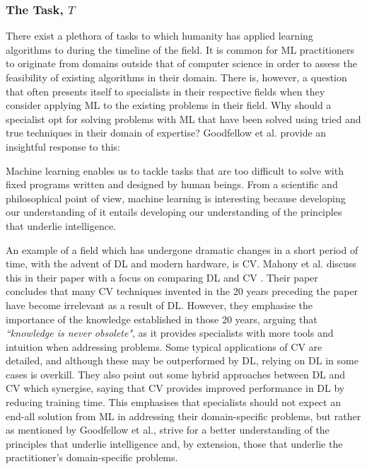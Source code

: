 \subsubsection{The Task, $T$}
There exist a plethora of tasks to which humanity has applied learning algorithms to during the timeline of the field. It is common for \gls{ML} practitioners to originate from domains outside that of computer science in order to assess the feasibility of existing algorithms in their domain. There is, however, a question that often presents itself to specialists in their respective fields when they consider applying \gls{ML} to the existing problems in their field. Why should a specialist opt for solving problems with \gls{ML} that have been solved using tried and true techniques in their domain of expertise? Goodfellow et al. \cite{Goodfellow-et-al-2016} provide an insightful response to this:

\begin{fancyquotes}
    Machine learning enables us to tackle tasks that are too difficult
    to solve with fixed programs written and designed by human beings. From a
    scientific and philosophical point of view, machine learning is interesting
    because developing our understanding of it entails developing our
    understanding of the principles that underlie intelligence.
\end{fancyquotes}

An example of a field which has undergone dramatic changes in a short period of
time, with the advent of \gls{DL} and modern hardware, is \gls{CV}. Mahony et
al. discuss this in their paper with a focus on comparing \gls{DL} and \gls{CV}
\cite{Mahony-et-al-2020}. Their paper concludes that many \gls{CV} techniques
invented in the 20 years preceding the paper have become irrelevant as a result
of \gls{DL}. However, they emphasise the importance of the knowledge
established in those 20 years, arguing that \textit{``knowledge is never
obsolete"}, as it provides specialists with more tools and intuition when
addressing problems. Some typical applications of \gls{CV} are detailed, and
although these may be outperformed by \gls{DL}, relying on \gls{DL} in some
cases is overkill. They also point out some hybrid approaches between \gls{DL}
and \gls{CV} which synergise, saying that \gls{CV} provides improved performance
in \gls{DL} by reducing training time. This emphasises that specialists should
not expect an end-all solution from \gls{ML} in addressing their domain-specific
problems, but rather as mentioned by Goodfellow et al., strive for a better
understanding of the principles that underlie intelligence and, by extension,
those that underlie the practitioner's domain-specific problems.

